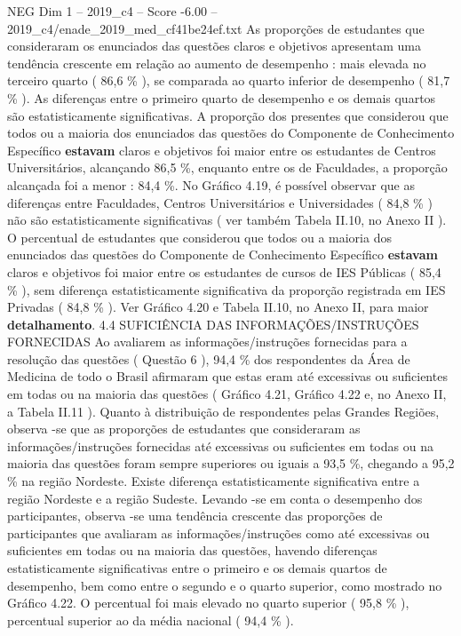 \begin{textsample}{NEG Dim 1 – 2019\_c4 – Score -6.00 – 2019\_c4/enade\_2019\_med\_cf41be24ef.txt}
As proporções de estudantes que consideraram os enunciados das questões claros e objetivos apresentam uma tendência crescente em relação ao aumento de desempenho : mais elevada no terceiro quarto ( 86,6 \% ), se comparada ao quarto inferior de desempenho ( 81,7 \% ).
As diferenças entre o primeiro quarto de desempenho e os demais quartos são estatisticamente significativas.
A proporção dos presentes que considerou que todos ou a maioria dos enunciados das questões do Componente de Conhecimento Específico \textbf{estavam} claros e objetivos foi maior entre os estudantes de Centros Universitários, alcançando 86,5 \%, enquanto entre os de Faculdades, a proporção alcançada foi a menor : 84,4 \%.
No Gráfico 4.19, é possível observar que as diferenças entre Faculdades, Centros Universitários e Universidades ( 84,8 \% ) não são estatisticamente significativas ( ver também Tabela II.10, no Anexo II ).
O percentual de estudantes que considerou que todos ou a maioria dos enunciados das questões do Componente de Conhecimento Específico \textbf{estavam} claros e objetivos foi maior entre os estudantes de cursos de IES Públicas ( 85,4 \% ), sem diferença estatisticamente significativa da proporção registrada em IES Privadas ( 84,8 \% ).
Ver Gráfico 4.20 e Tabela II.10, no Anexo II, para maior \textbf{detalhamento}. 4.4 SUFICIÊNCIA DAS INFORMAÇÕES/INSTRUÇÕES FORNECIDAS Ao avaliarem as informações/instruções fornecidas para a resolução das questões ( Questão 6 ), 94,4 \% dos respondentes da Área de Medicina de todo o Brasil afirmaram que estas eram até excessivas ou suficientes em todas ou na maioria das questões ( Gráfico 4.21, Gráfico 4.22 e, no Anexo II, a Tabela II.11 ).
Quanto à distribuição de respondentes pelas Grandes Regiões, observa -se que as proporções de estudantes que consideraram as informações/instruções fornecidas até excessivas ou suficientes em todas ou na maioria das questões foram sempre superiores ou iguais a 93,5 \%, chegando a 95,2 \% na região Nordeste.
Existe diferença estatisticamente significativa entre a região Nordeste e a região Sudeste.
Levando -se em conta o desempenho dos participantes, observa -se uma tendência crescente das proporções de participantes que avaliaram as informações/instruções como até excessivas ou suficientes em todas ou na maioria das questões, havendo diferenças estatisticamente significativas entre o primeiro e os demais quartos de desempenho, bem como entre o segundo e o quarto superior, como mostrado no Gráfico 4.22.
O percentual foi mais elevado no quarto superior ( 95,8 \% ), percentual superior ao da média nacional ( 94,4 \% ).

\end{textsample}
